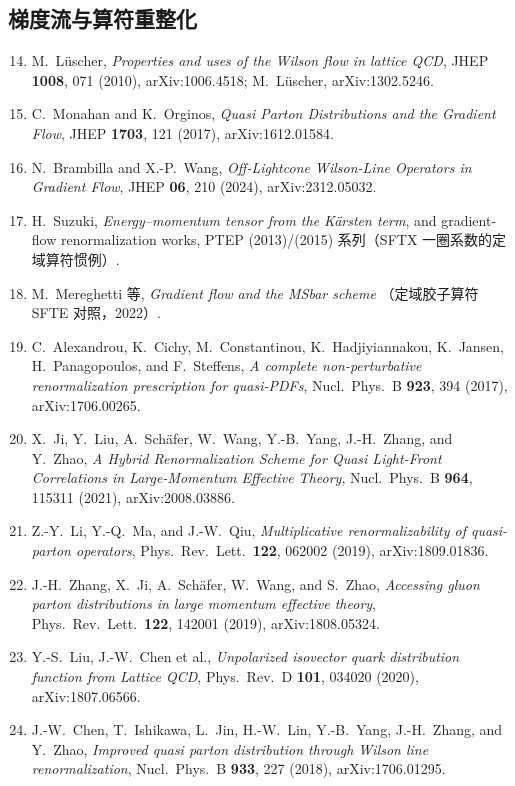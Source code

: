 \documentclass[11pt,a4paper]{ctexart}
\begin{document}
\subsection*{梯度流与算符重整化}
\begin{enumerate}\setcounter{enumi}{13}
  \item M.~L\"uscher, \textit{Properties and uses of the Wilson flow in
  lattice QCD}, JHEP \textbf{1008}, 071 (2010), arXiv:1006.4518;
  M.~L\"uscher, arXiv:1302.5246.
  \item C.~Monahan and K.~Orginos, \textit{Quasi Parton Distributions
  and the Gradient Flow}, JHEP \textbf{1703}, 121 (2017),
  arXiv:1612.01584.
  \item N.~Brambilla and X.-P.~Wang, \textit{Off-Lightcone Wilson-Line
  Operators in Gradient Flow}, JHEP \textbf{06}, 210 (2024),
  arXiv:2312.05032.
  \item H.~Suzuki, \textit{Energy--momentum tensor from the K\"arsten
  term}, and gradient-flow renormalization works, PTEP (2013)/(2015)
  系列（SFTX 一圈系数的定域算符惯例）.
  \item M.~Mereghetti 等, \textit{Gradient flow and the MSbar scheme}
  （定域胶子算符 SFTE 对照，2022）.
  \item C.~Alexandrou, K.~Cichy, M.~Constantinou, K.~Hadjiyiannakou,
  K.~Jansen, H.~Panagopoulos, and F.~Steffens, \textit{A complete
  non-perturbative renormalization prescription for quasi-PDFs},
  Nucl.\ Phys.\ B \textbf{923}, 394 (2017), arXiv:1706.00265.
  \item X.~Ji, Y.~Liu, A.~Sch\"afer, W.~Wang, Y.-B.~Yang, J.-H.~Zhang,
  and Y.~Zhao, \textit{A Hybrid Renormalization Scheme for Quasi
  Light-Front Correlations in Large-Momentum Effective Theory},
  Nucl.\ Phys.\ B \textbf{964}, 115311 (2021), arXiv:2008.03886.
  \item Z.-Y.~Li, Y.-Q.~Ma, and J.-W.~Qiu, \textit{Multiplicative
  renormalizability of quasi-parton operators}, Phys.\ Rev.\ Lett.\
  \textbf{122}, 062002 (2019), arXiv:1809.01836.
  \item J.-H.~Zhang, X.~Ji, A.~Sch\"afer, W.~Wang, and S.~Zhao,
  \textit{Accessing gluon parton distributions in large momentum
  effective theory}, Phys.\ Rev.\ Lett.\ \textbf{122}, 142001 (2019),
  arXiv:1808.05324.
  \item Y.-S.~Liu, J.-W.~Chen et al., \textit{Unpolarized isovector
  quark distribution function from Lattice QCD}, Phys.\ Rev.\ D
  \textbf{101}, 034020 (2020), arXiv:1807.06566.
  \item J.-W.~Chen, T.~Ishikawa, L.~Jin, H.-W.~Lin, Y.-B.~Yang,
  J.-H.~Zhang, and Y.~Zhao, \textit{Improved quasi parton distribution
  through Wilson line renormalization}, Nucl.\ Phys.\ B \textbf{933},
  227 (2018), arXiv:1706.01295.
\end{enumerate}
\end{document}
